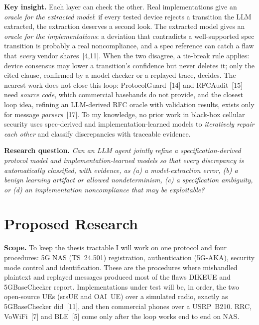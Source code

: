 \documentclass[11pt,letterpaper]{article}
\begin{document}
\textbf{Key insight.} Each layer can check the other. Real implementations give an \emph{oracle for the extracted model}: if every tested device rejects a transition the LLM extracted, the extraction deserves a second look. The extracted model gives an \emph{oracle for the implementations}: a deviation that contradicts a well-supported spec transition is probably a real noncompliance, and a spec reference can catch a flaw that \emph{every} vendor shares~[4,11]. When the two disagree, a tie-break rule applies: device consensus may lower a transition's confidence but never deletes it; only the cited clause, confirmed by a model checker or a replayed trace, decides. The nearest work does not close this loop: ProtocolGuard~[14] and RFCAudit~[15] need \emph{source code}, which commercial basebands do not provide, and the closest loop idea, refining an LLM-derived RFC oracle with validation results, exists only for message \emph{parsers}~[17]. To my knowledge, no prior work in black-box cellular security uses spec-derived and implementation-learned models to \emph{iteratively repair each other} and classify discrepancies with traceable evidence.

\textbf{Research question.} \emph{Can an LLM agent jointly refine a specification-derived protocol model and implementation-learned models so that every discrepancy is automatically classified, with evidence, as (a) a model-extraction error, (b) a benign learning artifact or allowed nondeterminism, (c) a specification ambiguity, or (d) an implementation noncompliance that may be exploitable?}

\section{Proposed Research}

\textbf{Scope.} To keep the thesis tractable I will work on one protocol and four procedures: 5G NAS (TS~24.501) registration, authentication (5G-AKA), security mode control and identification. These are the procedures where mishandled plaintext and replayed messages produced most of the flaws DIKEUE and 5GBaseChecker report. Implementations under test will be, in order, the two open-source UEs (srsUE and OAI~UE) over a simulated radio, exactly as 5GBaseChecker did~[11], and then commercial phones over a USRP~B210. RRC, VoWiFi~[7] and BLE~[5] come only after the loop works end to end on NAS.
\end{document}
